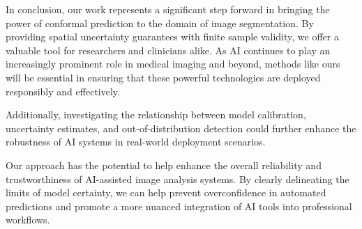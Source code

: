 In conclusion, our work represents a significant step forward in bringing the power of conformal prediction to the domain of image segmentation. By providing spatial uncertainty guarantees with finite sample validity, we offer a valuable tool for researchers and clinicians alike. As AI continues to play an increasingly prominent role in medical imaging and beyond, methods like ours will be essential in ensuring that these powerful technologies are deployed responsibly and effectively.

Additionally, investigating the relationship between model calibration, uncertainty estimates, and out-of-distribution detection could further enhance the robustness of AI systems in real-world deployment scenarios.

Our approach has the potential to help enhance the overall reliability and trustworthiness of AI-assisted image analysis systems. By clearly delineating the limits of model certainty, we can help prevent overconfidence in automated predictions and promote a more nuanced integration of AI tools into professional workflows.